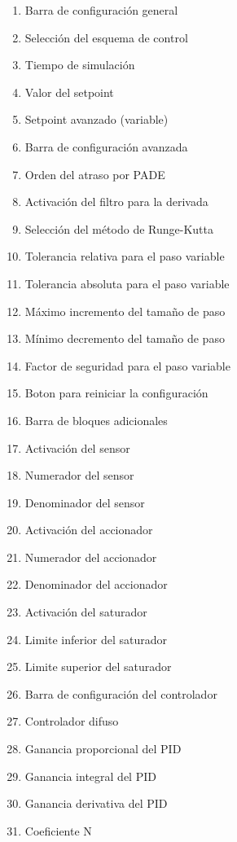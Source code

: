     \begin{multicols}{2}
        \begin{enumerate}[leftmargin=20pt]
            \item Barra de configuración general
            \item Selección del esquema de control
            \item Tiempo de simulación
            \item Valor del setpoint
            \item Setpoint avanzado (variable)
            \item Barra de configuración avanzada
            \item Orden del atraso por PADE
            \item Activación del filtro para la derivada
            \item Selección del método de Runge-Kutta
            \item Tolerancia relativa para el paso variable
            \item Tolerancia absoluta para el paso variable
            \item Máximo incremento del tamaño de paso
            \item Mínimo decremento del tamaño de paso
            \item Factor de seguridad para el paso variable
            \item Boton para reiniciar la configuración
            \item Barra de bloques adicionales
            \item Activación del sensor
            \item Numerador del sensor
            \item Denominador del sensor
            \item Activación del accionador
            \item Numerador del accionador
            \item Denominador del accionador
            \item Activación del saturador
            \item Limite inferior del saturador
            \item Limite superior del saturador
            \item Barra de configuración del controlador
            \item Controlador difuso
            \item Ganancia proporcional del PID
            \item Ganancia integral del PID
            \item Ganancia derivativa del PID
            \item Coeficiente N
        \end{enumerate}
    \end{multicols}

